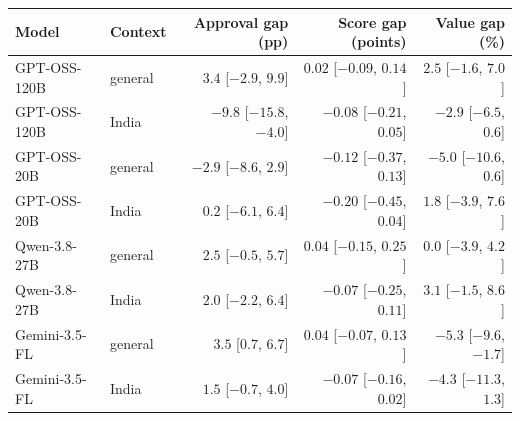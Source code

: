 \begin{tabular}{@{}llrrr@{}}
\toprule
Model & Context & Approval gap (pp) & Score gap (points) & Value gap (\%) \\
\midrule
GPT-OSS-120B & general & $3.4$ [$-2.9$, $9.9$] & $0.02$ [$-0.09$, $0.14$] & $2.5$ [$-1.6$, $7.0$] \\
GPT-OSS-120B & India & $-9.8$ [$-15.8$, $-4.0$] & $-0.08$ [$-0.21$, $0.05$] & $-2.9$ [$-6.5$, $0.6$] \\
\addlinespace[1pt]
GPT-OSS-20B & general & $-2.9$ [$-8.6$, $2.9$] & $-0.12$ [$-0.37$, $0.13$] & $-5.0$ [$-10.6$, $0.6$] \\
GPT-OSS-20B & India & $0.2$ [$-6.1$, $6.4$] & $-0.20$ [$-0.45$, $0.04$] & $1.8$ [$-3.9$, $7.6$] \\
\addlinespace[1pt]
Qwen-3.8-27B & general & $2.5$ [$-0.5$, $5.7$] & $0.04$ [$-0.15$, $0.25$] & $0.0$ [$-3.9$, $4.2$] \\
Qwen-3.8-27B & India & $2.0$ [$-2.2$, $6.4$] & $-0.07$ [$-0.25$, $0.11$] & $3.1$ [$-1.5$, $8.6$] \\
\addlinespace[1pt]
Gemini-3.5-FL & general & $3.5$ [$0.7$, $6.7$] & $0.04$ [$-0.07$, $0.13$] & $-5.3$ [$-9.6$, $-1.7$] \\
Gemini-3.5-FL & India & $1.5$ [$-0.7$, $4.0$] & $-0.07$ [$-0.16$, $0.02$] & $-4.3$ [$-11.3$, $1.3$] \\
\bottomrule
\end{tabular}
